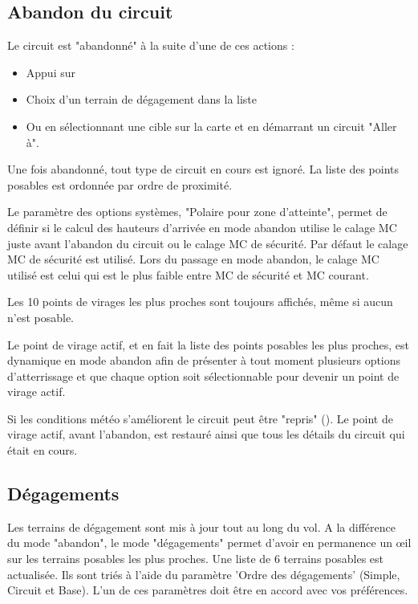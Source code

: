 \subsection*{Abandon du circuit}\label{sec:taskabort}
Le circuit est "abandonné" à la suite d'une de ces actions :
\begin{itemize}
\item Appui sur  \blink{}
\item Choix d'un terrain de dégagement dans la liste  
 \blink{}
\item Ou en sélectionnant une cible sur la carte et en démarrant un circuit "Aller à".
\end{itemize}

Une fois abandonné, tout type de circuit en cours est ignoré. La liste des points posables est ordonnée par ordre de proximité.

Le paramètre des options systèmes, "Polaire pour zone d'atteinte", permet de définir si le calcul des hauteurs d'arrivée en mode abandon utilise le calage MC juste avant l'abandon du circuit ou le calage MC de sécurité.  Par défaut le calage MC de sécurité est utilisé. Lors du passage en mode abandon, le calage MC utilisé est celui qui est le plus faible entre MC de sécurité et MC courant.

Les 10 points de virages les plus proches sont toujours affichés, même si aucun n'est posable.

Le point de virage actif, et en fait la liste des points posables les plus proches, est dynamique en mode abandon afin de présenter à tout moment plusieurs options d'atterrissage et que chaque option soit sélectionnable pour devenir un point de virage actif.

Si les conditions météo s'améliorent le circuit peut être "repris" (\blink{}). Le point de virage actif, avant l'abandon, est restauré ainsi que tous les détails du circuit qui était en cours. 

\subsection*{Dégagements} \label{sec:alternates}
Les terrains de dégagement sont mis à jour tout au long du vol. A la différence du mode "abandon", le mode "dégagements" permet d'avoir en permanence un œil sur les terrains posables les plus proches. Une liste de 6 terrains posables est actualisée. Ils sont triés à l'aide du paramètre 'Ordre des dégagements' (Simple, Circuit et Base).  L'un de ces paramètres doit être en accord avec vos préférences.

